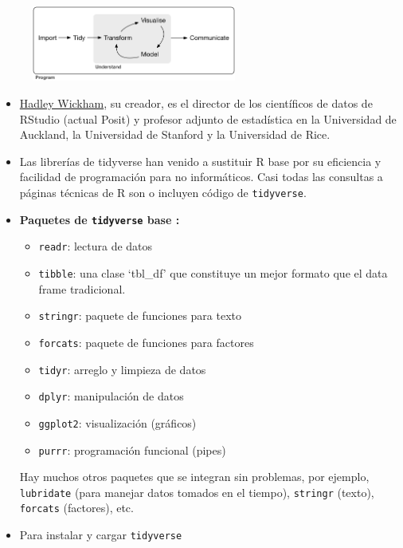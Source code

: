\documentclass[
  letterpaper,
  DIV=11,
  numbers=noendperiod]{scrreprt}
\providecommand{\tightlist}{%
  \setlength{\itemsep}{0pt}\setlength{\parskip}{0pt}}\usepackage{longtable,booktabs,array}
\begin{document}
\begin{figure}

{\centering \includegraphics[width=0.6\textwidth,height=\textheight]{Figuras/data-science.png}

}

\end{figure}

\begin{itemize}
\item
  \href{https://hadley.nz/}{Hadley Wickham}, su creador, es el director
  de los científicos de datos de RStudio (actual Posit) y profesor
  adjunto de estadística en la Universidad de Auckland, la Universidad
  de Stanford y la Universidad de Rice.
\item
  Las librerías de tidyverse han venido a sustituir R base por su
  eficiencia y facilidad de programación para no informáticos. Casi
  todas las consultas a páginas técnicas de R son o incluyen código de
  \texttt{tidyverse}.
\item
  \textbf{Paquetes de \texttt{tidyverse} base :}

  \begin{itemize}
  \tightlist
  \item
    \texttt{readr}: lectura de datos
  \item
    \texttt{tibble}: una clase `tbl\_df' que constituye un mejor formato
    que el data frame tradicional.
  \item
    \texttt{stringr}: paquete de funciones para texto
  \item
    \texttt{forcats}: paquete de funciones para factores
  \item
    \texttt{tidyr}: arreglo y limpieza de datos
  \item
    \texttt{dplyr}: manipulación de datos
  \item
    \texttt{ggplot2}: visualización (gráficos)
  \item
    \texttt{purrr}: programación funcional (pipes)
  \end{itemize}

  Hay muchos otros paquetes que se integran sin problemas, por ejemplo,
  \texttt{lubridate} (para manejar datos tomados en el tiempo),
  \texttt{stringr} (texto), \texttt{forcats} (factores), etc.
\item
  Para instalar y cargar \texttt{tidyverse}
\end{itemize}
\end{document}
